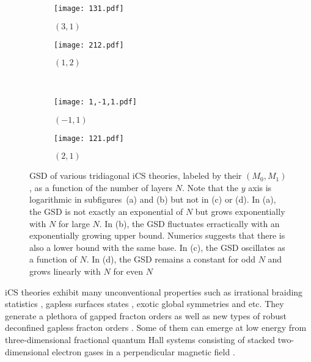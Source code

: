 \documentclass[aps,prb,twocolumn,superscriptaddress,floatfix,10pt,nofootinbib]{revtex4-2}
\theoremstyle{definition}
\begin{document}
\begin{figure*}
    \centering
    \begin{subfigure}[b]{0.35\textwidth}
    \texttt{[image: 131.pdf]}
    \caption{$(3,1)$}\label{fig:31}
    \end{subfigure}\qquad\qquad
    \begin{subfigure}[b]{0.35\textwidth}
    \texttt{[image: 212.pdf]}
    \caption{$(1,2)$}\label{fig:12}
    \end{subfigure}\\
    \begin{subfigure}[b]{0.35\textwidth}
    \texttt{[image: 1,-1,1.pdf]}
    \caption{$(-1,1)$}\label{fig:-11}
    \end{subfigure}\qquad\qquad
    \begin{subfigure}[b]{0.35\textwidth}
    \texttt{[image: 121.pdf]}
    \caption{$(2,1)$}\label{fig:21}
    \end{subfigure}
    \captionsetup{justification=Justified}
    \caption{GSD of various tridiagonal iCS theories, labeled by their $(M_0,M_1)$, as a function of the number of layers $N$. Note that the $y$ axis is logarithmic in subfigures~(a) and (b) but not in (c) or (d). In (a), the GSD is not exactly an exponential of $N$ but grows exponentially with $N$ for large $N$. In (b), the GSD fluctuates erractically with an exponentially growing upper bound. Numerics suggests that there is also a lower bound with the same base. In (c), the GSD oscillates as a function of $N$. In (d), the GSD remains a constant for odd $N$ and grows linearly with $N$ for even $N$ }
    \label{fig:GSD_iCS}
\end{figure*}

iCS theories exhibit many unconventional properties such as irrational braiding statistics \cite{PhysRevB.40.11943}, gapless surfaces states \cite{Naud_2000,Naud:2000xa}, exotic global symmetries \cite{Sullivan:2021rbk,Chen:2022hbz} and etc. They generate a plethora of gapped fracton orders as well as new types of robust deconfined gapless fracton orders \cite{Sullivan:2021rbk,Chen:2022hbz}. Some of them can emerge at low energy from three-dimensional fractional quantum Hall systems consisting of stacked two-dimensional electron gases in a perpendicular magnetic field \cite{PhysRevB.40.11943,PhysRevB.42.1339}.
\end{document}
